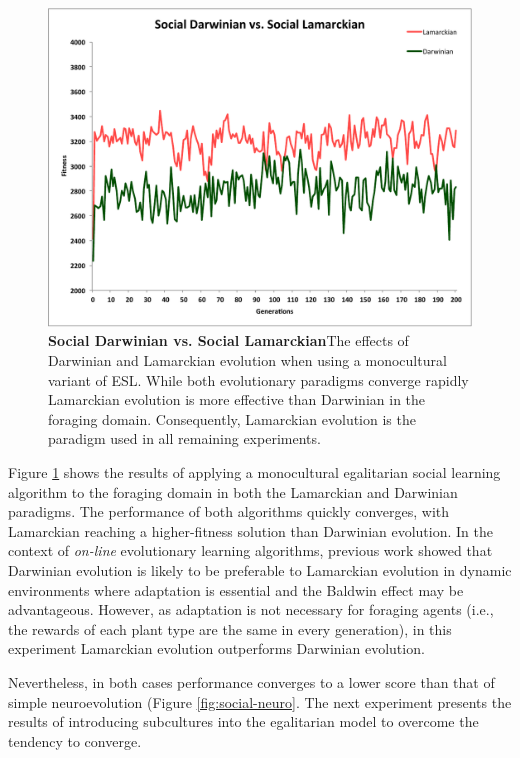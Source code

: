 \documentclass{sig-alternate}
\begin{document}
\begin{figure}
  \centering
    \includegraphics[scale=.41]{darwinian_vs_lamarckian_evolution.pdf}
  \caption{\textbf{Social Darwinian vs. Social Lamarckian}The effects of Darwinian and Lamarckian evolution when using a monocultural variant of ESL.  While both evolutionary paradigms converge rapidly Lamarckian evolution is more effective than Darwinian in the foraging domain.  Consequently, Lamarckian evolution is the paradigm used in all remaining experiments.}
  \label{fig:darwin-lamarck}
\end{figure}


Figure \ref{fig:darwin-lamarck} shows the results of applying a monocultural egalitarian social learning algorithm to the foraging domain in both the Lamarckian and Darwinian paradigms. The performance of both algorithms quickly converges, with Lamarckian reaching a higher-fitness solution than Darwinian evolution. In the context of \textit{on-line} evolutionary learning algorithms, previous work \cite{whiteson2006evolutionary} showed that Darwinian evolution is likely to be preferable to Lamarckian evolution in dynamic environments where adaptation is essential and the Baldwin effect \cite{simpson1953baldwin} may be advantageous. However, as adaptation is not necessary for foraging agents (i.e., the rewards of each plant type are the same in every generation), in this experiment Lamarckian evolution outperforms Darwinian evolution.

Nevertheless, in both cases performance converges to a lower score than that of simple neuroevolution (Figure \ref{fig:social-neuro}. The next experiment presents the results of introducing subcultures into the egalitarian model to overcome the tendency to converge.
\end{document}
